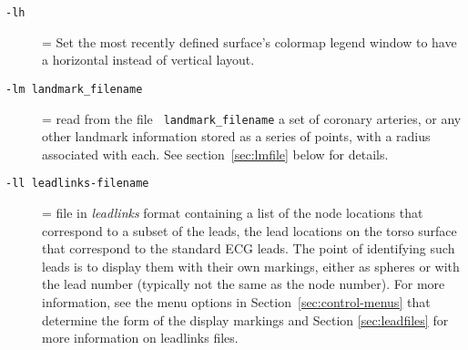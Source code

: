 \begin{description}
  \item[{\tt -lh }] = Set the most recently defined surface's colormap
        legend window to have a horizontal instead of vertical layout.

  \item[{\tt -lm landmark\_filename }] = read from the file {\tt
      landmark\_filename} a set of coronary arteries, or any other
    landmark information stored as a series of points, with a radius
    associated with each.  See section~\ref{sec:lmfile} below for
    details.
    
  \item[{\tt -ll leadlinks-filename}] = file in {\em
      leadlinks\/} format containing a list of the node locations
    that correspond to a subset of the leads, \eg{} the lead
    locations on the torso surface that correspond to the standard
    ECG leads.  The point of identifying such leads is to display
    them with their own markings, either as spheres or with the
    lead number (typically not the same as the node number).  For
    more information, 
    see the menu options in
    Section~\ref{sec:control-menus} that determine the form of the display
    markings and Section \ref{sec:leadfiles} for more information on 
    leadlinks files.
    





\end{description}

